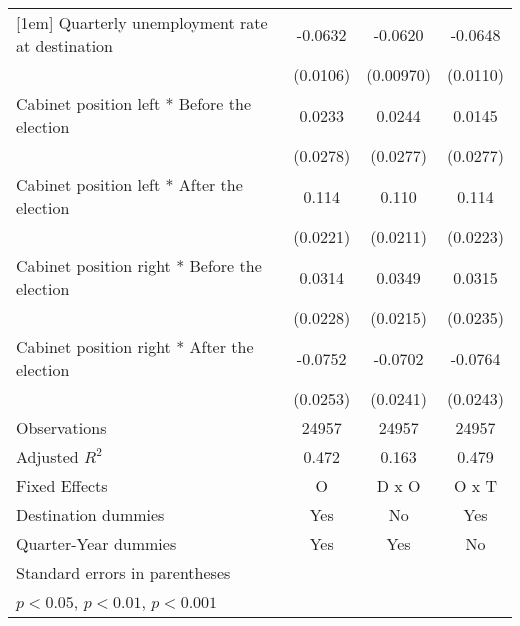 \begin{table}[htbp]
\begin{tabular}{l*{3}{c}}
[1em]
Quarterly unemployment rate at destination&     -0.0632\sym{***}&     -0.0620\sym{***}&     -0.0648\sym{***}\\
                    &    (0.0106)         &   (0.00970)         &    (0.0110)         \\
[1em]
Cabinet position left * Before the election&      0.0233         &      0.0244         &      0.0145         \\
                    &    (0.0278)         &    (0.0277)         &    (0.0277)         \\
[1em]
Cabinet position left * After the election&       0.114\sym{***}&       0.110\sym{***}&       0.114\sym{***}\\
                    &    (0.0221)         &    (0.0211)         &    (0.0223)         \\
[1em]
Cabinet position right * Before the election&      0.0314         &      0.0349         &      0.0315         \\
                    &    (0.0228)         &    (0.0215)         &    (0.0235)         \\
[1em]
Cabinet position right * After the election&     -0.0752\sym{**} &     -0.0702\sym{**} &     -0.0764\sym{**} \\
                    &    (0.0253)         &    (0.0241)         &    (0.0243)         \\
\hline
Observations        &       24957         &       24957         &       24957         \\
Adjusted \(R^{2}\)  &       0.472         &       0.163         &       0.479         \\
Fixed Effects       &           O         &       D x O         &       O x T         \\
Destination dummies &         Yes         &          No         &         Yes         \\
Quarter-Year dummies&         Yes         &         Yes         &          No         \\
\hline\hline
\multicolumn{4}{l}{\footnotesize Standard errors in parentheses}\\
\multicolumn{4}{l}{\footnotesize \sym{*} \(p<0.05\), \sym{**} \(p<0.01\), \sym{***} \(p<0.001\)}\\
\end{tabular}
\end{table}
